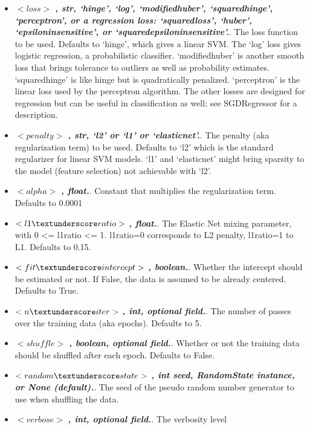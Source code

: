 \begin{itemize}
  \item $<loss>$ \textbf{\textit{, str, ‘hinge’, ‘log’, ‘modified\textunderscore huber’, ‘squared\textunderscore hinge’, ‘perceptron’, or a regression loss: ‘squared\textunderscore loss’, ‘huber’, ‘epsilon\textunderscore insensitive’, or ‘squared\textunderscore epsilon\textunderscore insensitive’.}}. The loss function to be used. Defaults to ‘hinge’, which gives a linear SVM. The ‘log’ loss gives logistic regression, a probabilistic classifier. ‘modified\textunderscore huber’ is another smooth loss that brings tolerance to outliers as well as probability estimates. ‘squared\textunderscore hinge’ is like hinge but is quadratically penalized. ‘perceptron’ is the linear loss used by the perceptron algorithm. The other losses are designed for regression but can be useful in classification as well; see SGDRegressor for a description.
  \item $<penalty>$ \textbf{\textit{, str, ‘l2’ or ‘l1’ or ‘elasticnet’.}}. The penalty (aka regularization term) to be used. Defaults to ‘l2’ which is the standard regularizer for linear SVM models. ‘l1’ and ‘elasticnet’ might bring sparsity to the model (feature selection) not achievable with ‘l2’.
  \item $<alpha>$ \textbf{\textit{, float.}}. Constant that multiplies the regularization term. Defaults to 0.0001
  \item $<l1\textunderscore ratio>$ \textbf{\textit{, float.}}. The Elastic Net mixing parameter, with 0 <= l1\textunderscore ratio <= 1. l1\textunderscore ratio=0 corresponds to L2 penalty, l1\textunderscore ratio=1 to L1. Defaults to 0.15.
  \item $<fit\textunderscore intercept>$ \textbf{\textit{, boolean.}}. Whether the intercept should be estimated or not. If False, the data is assumed to be already centered. Defaults to True.
  \item $<n\textunderscore iter>$ \textbf{\textit{, int, optional field.}}. The number of passes over the training data (aka epochs). Defaults to 5.
  \item $<shuffle>$ \textbf{\textit{, boolean, optional field.}}. Whether or not the training data should be shuffled after each epoch. Defaults to False.
  \item $<random\textunderscore state>$ \textbf{\textit{, int seed, RandomState instance, or None (default).}}. The seed of the pseudo random number generator to use when shuffling the data.
  \item $<verbose>$ \textbf{\textit{, int, optional field.}}. The verbosity level

\end{itemize}
